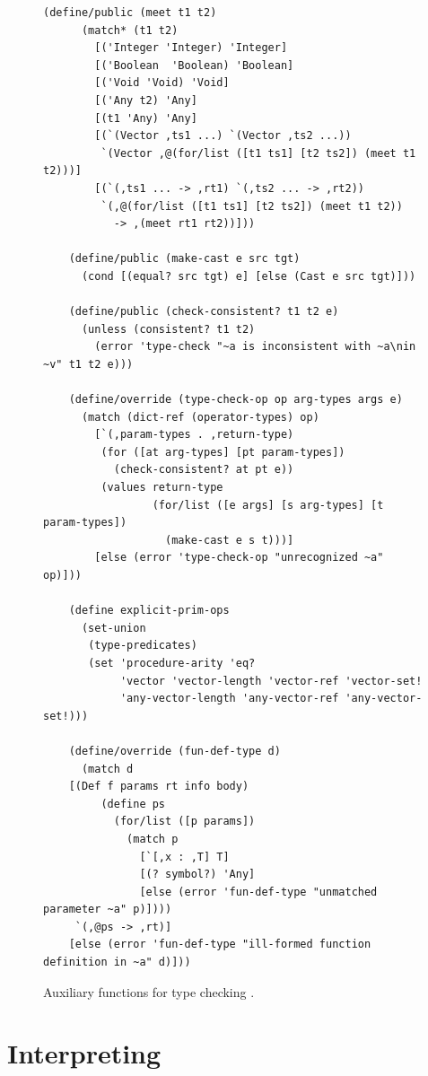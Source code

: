 \documentclass[7x10]{TimesAPriori_MIT}%
\numberwithin{theorem}{chapter}
\numberwithin{definition}{chapter}
\numberwithin{equation}{chapter}
\begin{document}
{\begin{figure}[tbp]
\begin{tcolorbox}[colback=white]
\begin{lstlisting}[basicstyle=\ttfamily\scriptsize]
    (define/public (meet t1 t2)
      (match* (t1 t2)
        [('Integer 'Integer) 'Integer]
        [('Boolean  'Boolean) 'Boolean]
        [('Void 'Void) 'Void]
        [('Any t2) 'Any]
        [(t1 'Any) 'Any]
        [(`(Vector ,ts1 ...) `(Vector ,ts2 ...))
         `(Vector ,@(for/list ([t1 ts1] [t2 ts2]) (meet t1 t2)))]
        [(`(,ts1 ... -> ,rt1) `(,ts2 ... -> ,rt2))
         `(,@(for/list ([t1 ts1] [t2 ts2]) (meet t1 t2))
           -> ,(meet rt1 rt2))]))

    (define/public (make-cast e src tgt)
      (cond [(equal? src tgt) e] [else (Cast e src tgt)]))

    (define/public (check-consistent? t1 t2 e)
      (unless (consistent? t1 t2)
        (error 'type-check "~a is inconsistent with ~a\nin ~v" t1 t2 e)))

    (define/override (type-check-op op arg-types args e)
      (match (dict-ref (operator-types) op)
        [`(,param-types . ,return-type)
         (for ([at arg-types] [pt param-types]) 
           (check-consistent? at pt e))
         (values return-type
                 (for/list ([e args] [s arg-types] [t param-types])
                   (make-cast e s t)))]
        [else (error 'type-check-op "unrecognized ~a" op)]))

    (define explicit-prim-ops
      (set-union
       (type-predicates)
       (set 'procedure-arity 'eq?
            'vector 'vector-length 'vector-ref 'vector-set!
            'any-vector-length 'any-vector-ref 'any-vector-set!)))

    (define/override (fun-def-type d)
      (match d
	[(Def f params rt info body)
         (define ps
           (for/list ([p params])
             (match p
               [`[,x : ,T] T]
               [(? symbol?) 'Any]
               [else (error 'fun-def-type "unmatched parameter ~a" p)])))
	 `(,@ps -> ,rt)]
	[else (error 'fun-def-type "ill-formed function definition in ~a" d)]))
\end{lstlisting}
\end{tcolorbox}

\caption{Auxiliary functions for type checking \LangGrad{}.}
\label{fig:type-check-Lgradual-aux}
\end{figure}

\fi}

\clearpage

\section{Interpreting \LangCast{}}
\label{sec:interp-casts}
\end{document}

